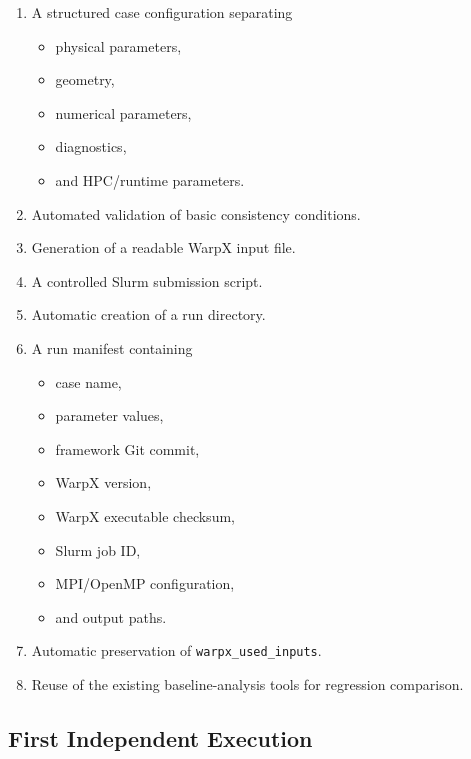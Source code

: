 \documentclass[11pt,a4paper]{article}
\begin{document}
\begin{enumerate}[label=\arabic*.]

    \item A structured case configuration separating
    \begin{itemize}
        \item physical parameters,
        \item geometry,
        \item numerical parameters,
        \item diagnostics,
        \item and HPC/runtime parameters.
    \end{itemize}

    \item Automated validation of basic consistency conditions.

    \item Generation of a readable WarpX input file.

    \item A controlled Slurm submission script.

    \item Automatic creation of a run directory.

    \item A run manifest containing
    \begin{itemize}
        \item case name,
        \item parameter values,
        \item framework Git commit,
        \item WarpX version,
        \item WarpX executable checksum,
        \item Slurm job ID,
        \item MPI/OpenMP configuration,
        \item and output paths.
    \end{itemize}

    \item Automatic preservation of
    \texttt{warpx\_used\_inputs}.

    \item Reuse of the existing baseline-analysis tools for regression
    comparison.

\end{enumerate}


\subsection{First Independent Execution}
\end{document}
